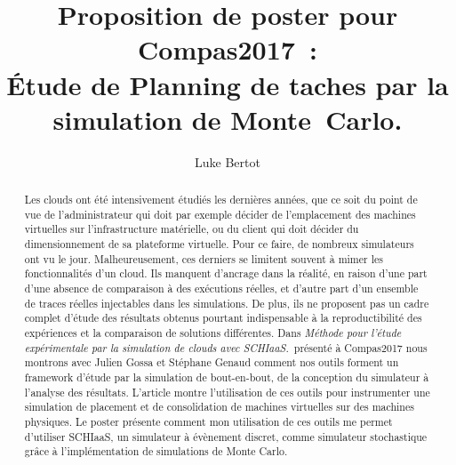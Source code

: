 \documentclass[parallelisme]{compas2017}
\title{Proposition de poster pour Compas2017~:\\
Étude de Planning de taches par la simulation de Monte~Carlo.}
\author{Luke Bertot}
\begin{document}
\maketitle


%

\begin{abstract} Les clouds ont été intensivement étudiés les dernières années,
	que ce soit du point de vue de l'administrateur qui doit par exemple
	décider de l'emplacement des machines virtuelles sur l'infrastructure
	matérielle, ou du client qui doit décider du dimensionnement de sa
	plateforme virtuelle. Pour ce faire, de nombreux simulateurs ont vu le
	jour. Malheureusement, ces derniers se limitent souvent à mimer les
	fonctionnalités d'un cloud. Ils manquent d'ancrage dans la réalité, en
	raison d'une part d'une absence de comparaison à des exécutions réelles,
	et d'autre part d'un ensemble de traces réelles injectables dans les
	simulations. De plus, ils ne proposent pas un cadre complet d'étude des
	résultats obtenus pourtant indispensable à la reproductibilité des
	expériences et la comparaison de solutions différentes. Dans
	\emph{Méthode pour l’étude expérimentale par la simulation de clouds
	avec SCHIaaS.}\ présenté à Compas2017 nous montrons avec Julien Gossa et
	Stéphane Genaud comment nos outils forment un framework d'étude par la
	simulation de bout-en-bout, de la conception du simulateur à l'analyse
	des résultats. L'article montre l'utilisation de ces outils pour
	instrumenter une simulation de placement et de consolidation de machines
	virtuelles sur des machines physiques. Le poster présente comment mon
	utilisation de ces outils me permet d'utiliser SCHIaaS, un simulateur à
	évènement discret, comme simulateur stochastique grâce à 
	l'implémentation de simulations de Monte Carlo.
	
	 \end{abstract}
\end{document}
